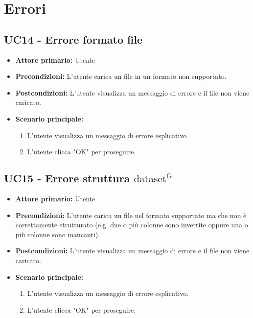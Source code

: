 \newpage


\section{Errori}
\subsection{UC14 - Errore formato file}
\label{sec:UC14 - Errore formato file}
\begin{itemize}
    \item \textbf{Attore primario:} Utente
    \item \textbf{Precondizioni:} L'utente carica un file in un formato non supportato.
    \item \textbf{Postcondizioni:} L'utente visualizza un messaggio di errore e il file non viene caricato.
    \item \textbf{Scenario principale:}
          \begin{enumerate}
              \item L'utente visualizza un messaggio di errore esplicativo
              \item L'utente clicca "OK" per proseguire.
          \end{enumerate}
\end{itemize}

\subsection{UC15 - Errore struttura ${\mathrm{dataset^{G}}}$}
\label{sec:UC15 - Errore struttura dataset}
\begin{itemize}
    \item \textbf{Attore primario:} Utente
    \item \textbf{Precondizioni:} L'utente carica un file nel formato supportato ma che non è correttamente strutturato  
                                  (e.g. due o più colonne sono invertite oppure una o più colonne sono mancanti). 
    \item \textbf{Postcondizioni:} L'utente visualizza un messaggio di errore e il file non viene caricato.
    \item \textbf{Scenario principale:}
          \begin{enumerate}
              \item L'utente visualizza un messaggio di errore esplicativo.
              \item L'utente clicca "OK" per proseguire.
          \end{enumerate} 
\end{itemize}

